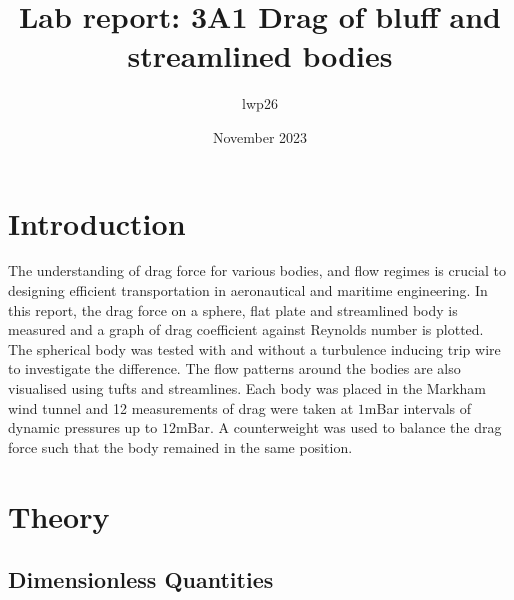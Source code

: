 \documentclass[8pt]{article}
\begin{document}


\title{Lab report: 3A1 Drag of bluff and streamlined bodies}
\author{lwp26}
\date{November 2023}
\maketitle

\section{Introduction}

The understanding of drag force for various bodies, and flow regimes is crucial to designing efficient transportation in aeronautical and maritime engineering.
In this report, the drag force on a sphere, flat plate and streamlined body is measured and a graph of drag coefficient against Reynolds number is plotted.
The spherical body was tested with and without a turbulence inducing trip wire to investigate the difference.
The flow patterns around the bodies are also visualised using tufts and streamlines.
Each body was placed in the Markham wind tunnel and 12 measurements of drag were taken at $1$mBar intervals of dynamic pressures up to $12$mBar.
A counterweight was used to balance the drag force such that the body remained in the same position.

\section{Theory}

\subsection{Dimensionless Quantities}
\end{document}
